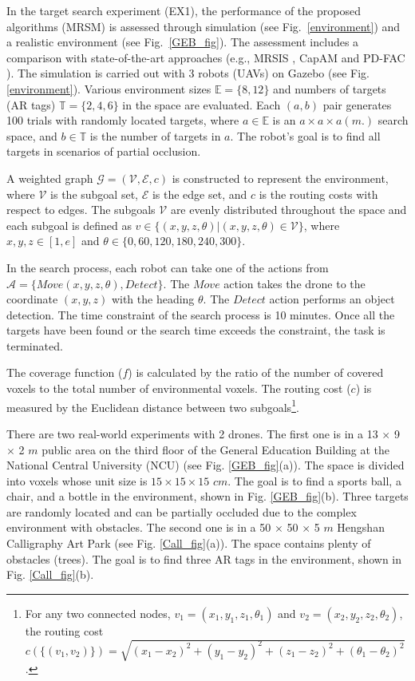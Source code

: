 In the target search experiment (EX1), the performance of the proposed algorithms (MRSM) is assessed through simulation
(see Fig.~\ref{environment}) and a realistic environment (see Fig.~\ref{GEB_fig}).
The assessment includes a comparison with state-of-the-art approaches (e.g., MRSIS \cite{li2024mrsis}, CapAM \cite{paull2022learning} and PD-FAC \cite{sheng2022pd}).
The simulation is carried out with 3 robots (UAVs) on Gazebo (see Fig. \ref{environment}). Various environment sizes $\mathit{\mathbb{E}}=\{8,12\}$ and numbers of targets (AR tags) $\mathit{\mathbb{T}}=\{2,4,6\}$ in the space are evaluated.
Each $(a,b)$ pair generates 100 trials with randomly located targets,
where $a \in \mathit{\mathbb{E}}$ is an $a \times a \times a (m.)$ search space, and $b \in \mathit{\mathbb{T}}$ is the number of targets in $a$.
The robot's goal is to find all targets in scenarios of partial occlusion.

A weighted graph $\mathcal{G}=(\mathcal{V}, \mathcal{E}, c)$ is constructed to represent the environment, where $\mathcal{V}$ is the subgoal set, $\mathcal{E}$ is the edge set, and $c$ is the routing costs with respect to edges.
The subgoals $\mathcal{V}$ are evenly distributed throughout the space and each subgoal is defined as $v\in \{(x,y,z,\theta)|(x,y,z,\theta)\in \mathcal{V}\}$, where $x,y,z\in[1, e]$ and $\theta\in\{0,60,120,180,240,300\}$.

In the search process, each robot can take one of the actions from $\mathcal{A}=\{Move(x,y,z,\theta), Detect\}$.
The $Move$ action takes the drone to the coordinate $(x,y,z)$ with the heading $\theta$.
The $Detect$ action performs an object detection.
The time constraint of the search process is 10 minutes.
Once all the targets have been found or the search time exceeds the constraint, the task is terminated.

The coverage function ($f$) is calculated by the ratio of the number of covered voxels to the total number of environmental voxels. The routing cost ($c$) is measured by the Euclidean distance between two subgoals\footnote{For any two connected nodes, $v_1=(x_1,y_1,z_1, \theta_1)$ and $v_2=(x_2,y_2,z_2,\theta_2)$, the routing cost $c(\{(v_1,v_2)\})=\sqrt{(x_1-x_2)^2+(y_1-y_2)^2+(z_1-z_2)^2+(\theta_1-\theta_2)^2}$.}.

There are two real-world experiments with 2 drones.
The first one is in a 13 $\times$ 9 $\times$ 2 $m$ public area on the third floor of the General Education Building at the National Central University (NCU) (see Fig. \ref{GEB_fig}(a)).
The space is divided into voxels whose unit size is $15 \times 15 \times 15$ $cm$.
The goal is to find a sports ball, a chair, and a bottle in the environment, shown in Fig. \ref{GEB_fig}(b).
Three targets are randomly located and can be partially occluded due to the complex environment with obstacles.
The second one is in a 50 $\times$ 50 $\times$ 5 $m$ Hengshan Calligraphy Art Park (see Fig. \ref{Call_fig}(a)).
The space contains plenty of obstacles (trees). The goal is to find three AR tags in the environment, shown in Fig. \ref{Call_fig}(b).

